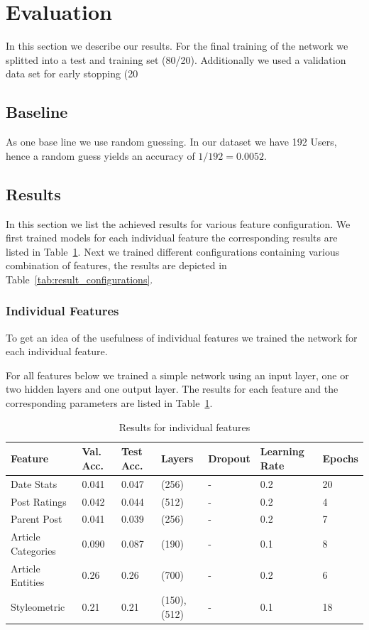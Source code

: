 \documentclass[acmsmall]{acmart}
\begin{document}
\section{Evaluation}
In this section we describe our results. For the final training of the network we splitted into a test and training set (80/20). 
Additionally we used a validation data set for early stopping (20%

\subsection{Baseline}
As one base line we use random guessing. In our dataset we have 192 Users, hence a random guess yields an accuracy of $1/192 = 0.0052$. 

\subsection{Results}
In this section we list the achieved results for various feature configuration.
We first trained models for each individual feature the corresponding results are listed in Table~\ref{tab:result_features}. 
Next we trained different configurations containing various combination of features, the results are depicted in Table~\ref{tab:result_configurations}.

\subsubsection{Individual Features}
To get an idea of the usefulness of individual features we trained the network for each individual feature. 

For all features below we trained a simple network using an input layer, one or two hidden layers and one output layer. 
The results for each feature and the corresponding parameters are listed in Table~\ref{tab:result_features}.

\begin{table}[H]
\begin{tabular}{lllllll}
Feature & Val. Acc. & Test Acc. & Layers & Dropout & Learning Rate & Epochs\\ \hline
Date Stats & 0.041 & 0.047 & (256) & - & 0.2 & 20 \\
Post Ratings & 0.042 & 0.044 & (512) & - & 0.2 & 4 \\
Parent Post & 0.041 & 0.039 & (256) & - & 0.2 & 7 \\
Article Categories & 0.090 & 0.087 & (190) & - & 0.1 & 8 \\
Article Entities & 0.26 & 0.26 &  (700)  & - & 0.2 & 6 \\
Styleometric & 0.21 & 0.21 & (150),(512) & - & 0.1 & 18 
\end{tabular}
\caption{Results for individual features}
\label{tab:result_features}
\end{table}
\end{document}
